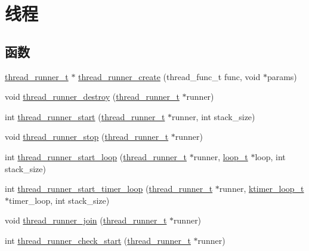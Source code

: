\hypertarget{group__thread}{}\section{线程}
\label{group__thread}
\subsection*{函数}
\begin{DoxyCompactItemize}
\item 
\hyperlink{struct__thread__runner__t}{thread\+\_\+runner\+\_\+t} $\ast$ \hyperlink{group__thread_gac20d7726e152e0b49209ce228893c25d}{thread\+\_\+runner\+\_\+create} (thread\+\_\+func\+\_\+t func, void $\ast$params)
\item 
void \hyperlink{group__thread_ga8b9d3d45b6055971fc40f24ec6572cf6}{thread\+\_\+runner\+\_\+destroy} (\hyperlink{struct__thread__runner__t}{thread\+\_\+runner\+\_\+t} $\ast$runner)
\item 
int \hyperlink{group__thread_ga1114fd962e310f9d31ed4e83d8a21897}{thread\+\_\+runner\+\_\+start} (\hyperlink{struct__thread__runner__t}{thread\+\_\+runner\+\_\+t} $\ast$runner, int stack\+\_\+size)
\item 
void \hyperlink{group__thread_gaa035f190ffd3d7f117b8fbb58716f042}{thread\+\_\+runner\+\_\+stop} (\hyperlink{struct__thread__runner__t}{thread\+\_\+runner\+\_\+t} $\ast$runner)
\item 
int \hyperlink{group__thread_ga93f88ba77e7eab786da6fe7d1f681a2e}{thread\+\_\+runner\+\_\+start\+\_\+loop} (\hyperlink{struct__thread__runner__t}{thread\+\_\+runner\+\_\+t} $\ast$runner, \hyperlink{struct__loop__t}{loop\+\_\+t} $\ast$loop, int stack\+\_\+size)
\item 
int \hyperlink{group__thread_ga9191991e2bd7f91fe68324c2855d581d}{thread\+\_\+runner\+\_\+start\+\_\+timer\+\_\+loop} (\hyperlink{struct__thread__runner__t}{thread\+\_\+runner\+\_\+t} $\ast$runner, \hyperlink{struct__ktimer__loop__t}{ktimer\+\_\+loop\+\_\+t} $\ast$timer\+\_\+loop, int stack\+\_\+size)
\item 
void \hyperlink{group__thread_ga813a718c56e0923be9396630c8460794}{thread\+\_\+runner\+\_\+join} (\hyperlink{struct__thread__runner__t}{thread\+\_\+runner\+\_\+t} $\ast$runner)
\item 
int \hyperlink{group__thread_ga95c00ec3d6ef1710cc8d8bb8cb7e585d}{thread\+\_\+runner\+\_\+check\+\_\+start} (\hyperlink{struct__thread__runner__t}{thread\+\_\+runner\+\_\+t} $\ast$runner)
\item 

\end{DoxyCompactItemize}
